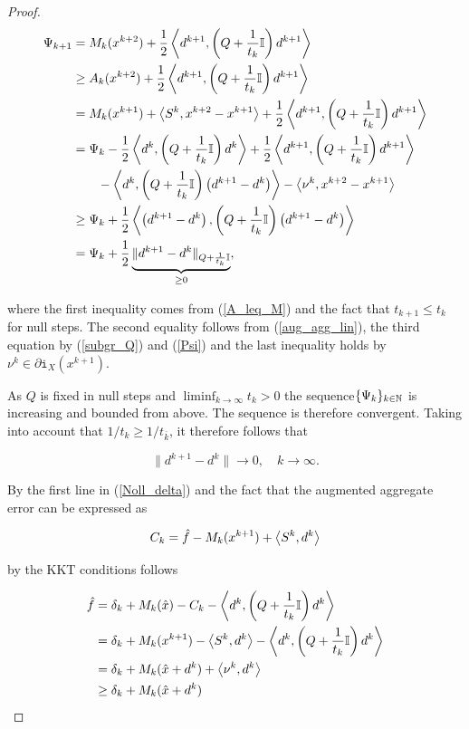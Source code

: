 \begin{proof}
	\begin{align*}
		\Psi_{k+1} &= M_k(x^{k+2})+\frac{1}{2}\left\langle d^{k+1},\left(Q+\frac{1}{t_k}\mathbb{I} \right)d^{k+1}\right\rangle \\
		&\geq A_k(x^{k+2})+\frac{1}{2}\left\langle d^{k+1},\left(Q+\frac{1}{t_k}\mathbb{I}\right)d^{k+1}\right\rangle \\
		&= M_k(x^{k+1})+\left\langle S^k,x^{k+2}-x^{k+1} \right\rangle +\frac{1}{2}\left\langle d^{k+1},\left(Q+\frac{1}{t_k}\mathbb{I}\right)d^{k+1}\right\rangle \\
		&= \Psi_k - \frac{1}{2}\left\langle d^{k},\left(Q+\frac{1}{t_k}\mathbb{I}\right)d^{k}\right\rangle + \frac{1}{2}\left\langle d^{k+1},\left(Q+\frac{1}{t_k}\mathbb{I}\right)d^{k+1}\right\rangle \\
		& \qquad -\left\langle d^{k},\left(Q+\frac{1}{t_k}\mathbb{I}\right)\left(d^{k+1} - d^{k}\right)\right\rangle - \left\langle \nu^k, x^{k+2}-x^{k+1}\right\rangle\\
		&\geq \Psi_k + \frac{1}{2}\left\langle\left(d^{k+1}-d^{k}\right),\left(Q+\frac{1}{t_k}\mathbb{I}\right)\left(d^{k+1} - d^{k}\right)\right\rangle \\
		& =\Psi_k + \frac{1}{2}\underbrace{\|d^{k+1}-d^k\|_{Q+\frac{ 1}{t_k}\mathbb{I}}}_{\geq 0},
	\end{align*}
	
where the first inequality comes from (\ref{A_leq_M}) and the fact that \(t_{k+1} \leq t_{k}\) for null steps. The second equality follows from (\ref{aug_agg_lin}), the third equation by (\ref{subgr_Q}) and (\ref{Psi}) and the last inequality holds by \(\nu^k \in \partial \mathtt{i}_X(x^{k+1})\).

As \(Q\) is fixed in null steps and  \(\liminf_{k \to \infty} t_k > 0\) the sequence\(\{\Psi_k\}_{k \in \mathbb{N}}\) is increasing and bounded from above. The sequence is therefore convergent.
Taking into account that \(1/t_k \geq 1/t_{\bar{k}}\), it therefore follows that

\begin{equation}
	\|d^{k+1}-d^k\| \to 0, \quad k \to \infty.
\label{d_to_0}
\end{equation}

By the first line in (\ref{Noll_delta}) and the fact that the augmented aggregate error can be expressed as

\begin{equation*}
	C_k = \hat{f}-M_k(x^{k+1})+\left\langle S^k,d^k \right\rangle 
\end{equation*}

by the KKT conditions follows

\begin{align*}
	\hat{f} &= \delta_k+M_k(\hat{x})-C_k-\left\langle d^{k},\left(Q+\frac{1}{t_k}\mathbb{I}\right)d^{k}\right\rangle \\
	&= \delta_k + M_k(x^{k+1})-\left\langle S^k,d^k \right\rangle-\left\langle d^{k},\left(Q+\frac{1}{t_k}\mathbb{I}\right)d^{k}\right\rangle \\
	&= \delta_k + M_k(\hat{x}+d^k)+\left\langle \nu^k, d^k \right\rangle\\
	&\geq \delta_k+M_k(\hat{x}+d^k)
\end{align*}


\end{proof}
